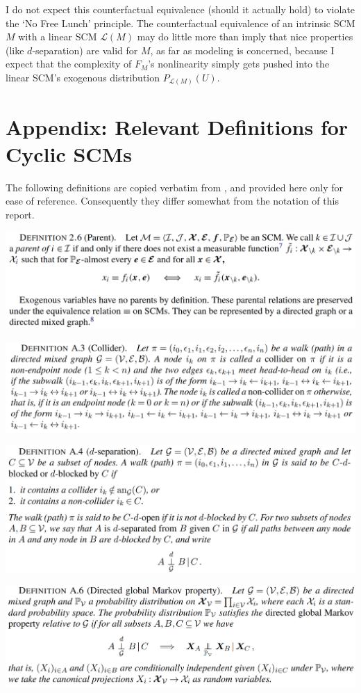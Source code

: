 \documentclass[letterpaper,10pt]{article}
\begin{document}
I do not expect this counterfactual equivalence (should it actually hold) to violate the `No Free Lunch' principle.
The counterfactual equivalence of an intrinsic SCM $M$ with a linear SCM $\mathcal{L}(M)$ may do little more than imply that nice properties (like $d$-separation) are valid for $M$, as far as modeling is concerned, because I expect that the complexity of $F_M$'s nonlinearity simply gets pushed into the linear SCM's exogenous distribution $P_{\mathcal{L}(M)}(U)$.

\section{Appendix: Relevant Definitions for Cyclic SCMs}\label{foundations-material}
The following definitions are copied verbatim from \cite{Foundations}, and provided here only for ease of reference. Consequently they differ somewhat from the notation of this report.

\centering
\includegraphics[width=.8\linewidth]{pics/cited/parents_Foundations.png}

\centering
\includegraphics[width=.8\linewidth]{pics/cited/collider_Foundations.png}

\centering
\includegraphics[width=.8\linewidth]{pics/cited/d-separation_Foundations.png}

\centering
\includegraphics[width=.8\linewidth]{pics/cited/directed_global_Markov_Foundations.png}
\end{document}
